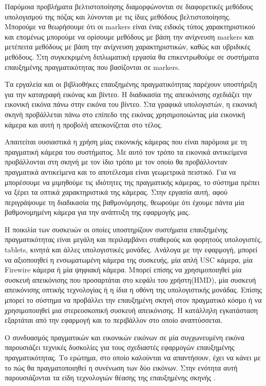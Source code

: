 Παρόμοια προβλήματα βελτιστοποίησης διαμορφώνονται σε διαφορετικές μεθόδους υπολογισμού της πόζας και λύνονται με τις ίδιες μεθόδους βελτιστοποίησης.  
Μπορούμε να θεωρήσουμε ότι οι markers είναι ένας ειδικός τύπος χαρακτηριστικού και επομένως μπορούμε να ορίσουμε μεθόδους με βάση την ανίχνευση markers και μετέπειτα μεθόδους με βάση την ανίχνευση χαρακτηριστικών, καθώς και υβριδικές μεθόδους. Στη συγκεκριμένη διπλωματική εργασία θα επικεντρωθούμε σε συστήματα επαυξημένης πραγματικότητας που βασίζονται σε markers.


Τα εργαλεία και οι βιβλιοθήκες επαυξημένης πραγματικότητας παρέχουν υποστήριξη για την καταγραφή εικόνας και βίντεο. Η διαδικασία της απεικόνισης σχεδιάζει την εικονική εικόνα πάνω στην εικόνα του βίντεο. Στα γραφικά υπολογιστών, η εικονική σκηνή προβάλλεται πάνω στο επίπεδο της εικόνας χρησιμοποιώντας μία εικονική κάμερα και αυτή η προβολή απεικονίζεται στο τέλος. 

Απαιτείται ουσιαστικά η χρήση μίας εικονικής κάμερας που είναι παρόμοια με τη πραγματική κάμερα του συστήματος. Με αυτό τον τρόπο τα εικονικά αντικείμενα προβάλλονται στη σκηνή με τον ίδιο τρόπο με τον οποίο θα προβάλλονταν πραγματικά αντικείμενα και το αποτέλεσμα είναι γεωμετρικά πειστικό. Για να μπορέσουμε να μιμηθούμε τις ιδιότητες της πραγματικής κάμερας, το σύστημα πρέπει να ξέρει τα οπτικά χαρακτηριστικά της κάμερας. Στην εργασία αυτή, αφού περιγράψουμε τη διαδικασία της βαθμονόμησης, θεωρούμε ότι έχουμε πάντα μία βαθμονομημένη κάμερα για την ανάπτυξη της εφαρμογής μας.



Η ποικιλία των συσκευών οι οποίες υποστηρίζουν συστήματα επαυξημένης πραγματικότητας είναι μεγάλη και περιλαμβάνει σταθερούς και φορητούς υπολογιστές, tablets, κινητά και άλλες υπολογιστικές μονάδες. Ανάλογα με την εφαρμογή, μπορεί να αξιοποιηθεί η ενσωματωμένη κάμερα της συσκευής, μία απλή USC κάμερα, μία Firewire κάμερα ή μία ψηφιακή κάμερα. Μπορεί επίσης να χρησιμοποιηθεί μία συσκευή απεικόνισης που προσαρτάται στο κεφάλι του χρήστη(HMD), μία συσκευή απεικόνισης οπτικής τεχνολογίας ή η ίδια η οθόνη της υπολογιστικής μονάδας. Επίσης μπορεί το σύστημα να προβάλλει την επαυξημένη σκηνή στον πραγματικό κόσμο \cite{jones2013illumiroom} ή να χρησιμοποιηθεί μια στερεοσκοπική συσκευή απεικόνισης. Η κατάλληλη εγκατάσταση εξαρτάται από την εφαρμογή και το περιβάλλον στο οποίο αναπτύσσεται.




Ο συνδυασμός πραγματικών και εικονικών εικόνων σε μία συγχωνευμένη εικόνα παρουσιάζει τεχνικές δυσκολίες για τους σχεδιαστές εφαρμογών επαυξημένης πραγματικότητας.  Το ερώτημα, στο οποίο καλούνται να απαντήσουν, έχει να κάνει με το πώς θα πραγματοποιηθεί η συνένωση των δύο εικόνων. Στην ενότητα αυτή παρουσιάζονται τα είδη τεχνολογιών θέασης της επαυξημένης σκηνής \cite{azuma2001} \cite{Vallino1998}.



